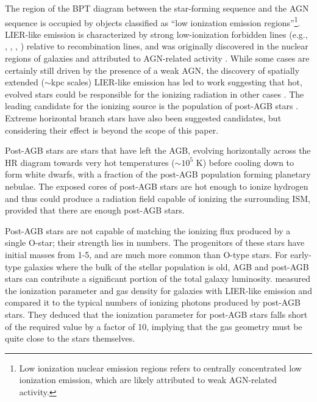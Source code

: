 

The region of the BPT diagram between the star-forming sequence and the AGN sequence is occupied by objects classified as ``low ionization emission regions''\citep[LIERs, ][]{Belfiore16}\footnote{Low ionization nuclear emission regions \citep[LINERs, ][]{Heckman1980} refers to centrally concentrated low ionization emission, which are likely attributed to weak AGN-related activity.}. LIER-like emission is characterized by strong low-ionization forbidden lines (e.g., \nii{}, \sii{}, \oii{}, \oi{}) relative to recombination lines, and was originally discovered in the nuclear regions of galaxies and attributed to AGN-related activity \citep{Kauffmann03b, Kewley06, Ho08}. While some cases are certainly still driven by the presence of a weak AGN, the discovery of spatially extended (${\sim}$kpc scales) LIER-like emission has led to work suggesting that hot, evolved stars could be responsible for the ionizing radiation in other cases \citep{Singh13, Belfiore16}. The leading candidate for the ionizing source is the population of post-AGB stars \citep{Binette94, Sarzi10, Yan12}. Extreme horizontal branch stars have also been suggested candidates, but considering their effect is beyond the scope of this paper.

Post-AGB stars are stars that have left the AGB, evolving horizontally across the HR diagram towards very hot temperatures ($\sim10^5$ K) before cooling down to form white dwarfs, with a fraction of the post-AGB population forming planetary nebulae. The exposed cores of post-AGB stars are hot enough to ionize hydrogen and thus could produce a radiation field capable of ionizing the surrounding ISM, provided that there are enough post-AGB stars. 

Post-AGB stars are not capable of matching the ionizing flux produced by a single O-star; their strength lies in numbers. The progenitors of these stars have initial masses from 1-5\Msun{}, and are much more common than O-type stars. For early-type galaxies where the bulk of the stellar population is old, AGB and post-AGB stars can contribute a significant portion of the total galaxy luminosity. \citet{Yan12} measured the ionization parameter and gas density for galaxies with LIER-like emission and compared it to the typical numbers of ionizing photons produced by post-AGB stars. They deduced that the ionization parameter for post-AGB stars falls short of the required value by a factor of 10, implying that the gas geometry must be quite close to the stars themselves.

